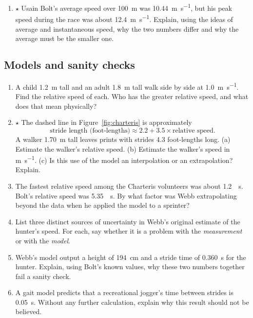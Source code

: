 \documentclass[11pt,twoside,openany]{book}
\newcounter{check}[chapter]
\begin{document}
\begin{enumerate}[label=\textbf{\thechapter.\arabic*},resume=exercises,leftmargin=*]
\begin{center}
\begin{tabular}{lccccc}
  \bottomrule
  \end{tabular}
  \end{center}
  (a) Find the average speed between $t=0$ and $t=6$. (b) Find the average speed between $t=6$ and $t=8$. (c) Was the object moving at constant speed throughout? Sketch the position--time graph and describe its shape.
  \item $\star$ Usain Bolt's average speed over \SI{100}{\metre} was \SI{10.44}{\metre\per\second}, but his peak speed during the race was about \SI{12.4}{\metre\per\second}. Explain, using the ideas of average and instantaneous speed, why the two numbers differ and why the average must be the smaller one.
\end{enumerate}

\subsection*{Models and sanity checks}
\begin{enumerate}[label=\textbf{\thechapter.\arabic*},resume=exercises,leftmargin=*]
  \item A child \SI{1.2}{\metre} tall and an adult \SI{1.8}{\metre} tall walk side by side at \SI{1.0}{\metre\per\second}. Find the relative speed of each. Who has the greater relative speed, and what does that mean physically?
  \item $\star$ The dashed line in Figure~\ref{fig:charteris} is approximately
  \[
  \text{stride length (foot-lengths)} \approx 2.2 + 3.5\times\text{relative speed}.
  \]
  A walker \SI{1.70}{\metre} tall leaves prints with strides \num{4.3} foot-lengths long. (a) Estimate the walker's relative speed. (b) Estimate the walker's speed in \si{\metre\per\second}. (c) Is this use of the model an interpolation or an extrapolation? Explain.
  \item The fastest relative speed among the Charteris volunteers was about \SI{1.2}{\per\second}. Bolt's relative speed was \SI{5.35}{\per\second}. By what factor was Webb extrapolating beyond the data when he applied the model to a sprinter?
  \item List three distinct sources of uncertainty in Webb's original estimate of the hunter's speed. For each, say whether it is a problem with the \emph{measurement} or with the \emph{model}.
  \item Webb's model output a height of \SI{194}{\centi\metre} and a stride time of \SI{0.360}{\second} for the hunter. Explain, using Bolt's known values, why these two numbers together fail a sanity check.
  \item A gait model predicts that a recreational jogger's time between strides is \SI{0.05}{\second}. Without any further calculation, explain why this result should not be believed.
\end{enumerate}
\end{document}
